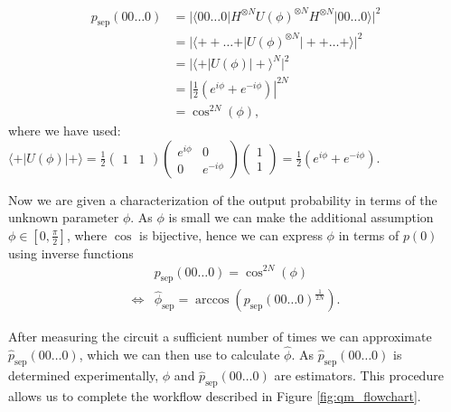 \begin{equation}
\begin{aligned}
    p_\text{sep}(00\ldots0) &= \vert \langle 00\ldots0\vert H^{\otimes N} U(\phi)^{\otimes N} H^{\otimes N} \vert 00\ldots0 \rangle \vert ^2\\
     &= \vert \langle ++\ldots+\vert U(\phi)^{\otimes N} \vert ++\ldots+ \rangle \vert ^2\\
     &= \vert \langle +\vert U(\phi)\vert + \rangle^N \vert ^2\\
     &=\left|  \frac{1}{2}\left( e^{i\phi} +e^{-i\phi}\right)\right|^{2N}\\
     &=\cos^{2N}(\phi)\label{eq:prob-zero-sep},
\end{aligned}
\end{equation}
where we have used: $\langle + \vert U(\phi)\vert +\rangle= \frac{1}{2} \begin{pmatrix} 1 & 1 \end{pmatrix} \begin{pmatrix}
        e^{i\phi} & 0\\
        0 & e^{-i\phi}
    \end{pmatrix}
    \begin{pmatrix}
        1 \\
        1
    \end{pmatrix}=\frac{1}{2}\left( e^{i\phi} +e^{-i\phi}\right)$.

Now we are given a characterization of the output probability in terms of the unknown parameter $\phi$. As $\phi$ is small we can make the additional assumption $\phi\in[0, \frac \pi 2]$, 
where $\cos$ is bijective, 
hence we can express $\phi$ in terms of $p(0)$ using inverse functions
\begin{equation}
    \begin{aligned}
        &p_\text{sep}(00\ldots 0)=\cos^{2N}(\phi)\\
        \iff  &\hat\phi_\text{sep} = \arccos({p_\text{sep}(00\ldots 0)^{\frac{1}{2N}}}).
    \end{aligned}
\label{eq:est-sep}
\end{equation}

After measuring the circuit a sufficient number of times we can approximate 
$\hat p_\text{sep}(00\ldots 0)$, which we can then use to calculate $\hat\phi$.
As $\hat p_\text{sep}(00\ldots 0)$ is determined experimentally, 
$\hat\phi$ and $\hat p_\text{sep}(00\ldots 0)$ are estimators.
This procedure allows us to complete the workflow described in Figure \ref{fig:qm_flowchart}. 


